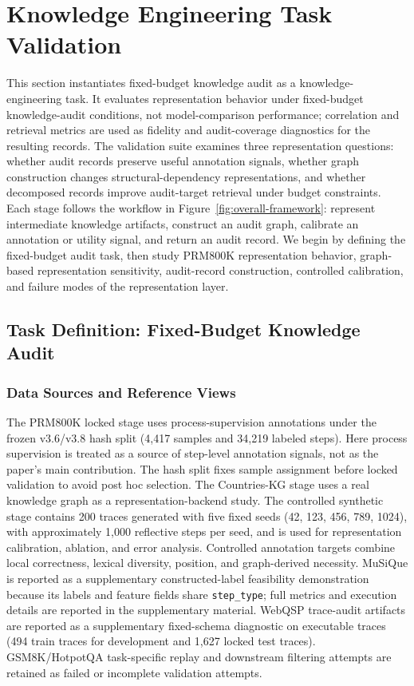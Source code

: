 \documentclass[a4paper,fleqn]{cas-sc}
\begin{document}
\FloatBarrier

\section{Knowledge Engineering Task Validation}
\label{sec:application}
\label{sec:experimental-results}

This section instantiates fixed-budget knowledge audit as a knowledge-engineering task. It evaluates representation behavior under fixed-budget knowledge-audit conditions, not model-comparison performance; correlation and retrieval metrics are used as fidelity and audit-coverage diagnostics for the resulting records. The validation suite examines three representation questions: whether audit records preserve useful annotation signals, whether graph construction changes structural-dependency representations, and whether decomposed records improve audit-target retrieval under budget constraints. Each stage follows the workflow in Figure~\ref{fig:overall-framework}: represent intermediate knowledge artifacts, construct an audit graph, calibrate an annotation or utility signal, and return an audit record. We begin by defining the fixed-budget audit task, then study PRM800K representation behavior, graph-based representation sensitivity, audit-record construction, controlled calibration, and failure modes of the representation layer.

\subsection{Task Definition: Fixed-Budget Knowledge Audit}
\label{sec:application-setup}

\subsubsection{Data Sources and Reference Views}

The PRM800K locked stage uses process-supervision annotations under the frozen v3.6/v3.8 hash split (4,417 samples and 34,219 labeled steps). Here process supervision is treated as a source of step-level annotation signals, not as the paper's main contribution. The hash split fixes sample assignment before locked validation to avoid post hoc selection. The Countries-KG stage uses a real knowledge graph as a representation-backend study. The controlled synthetic stage contains 200 traces generated with five fixed seeds (42, 123, 456, 789, 1024), with approximately 1,000 reflective steps per seed, and is used for representation calibration, ablation, and error analysis. Controlled annotation targets combine local correctness, lexical diversity, position, and graph-derived necessity. MuSiQue is reported as a supplementary constructed-label feasibility demonstration because its labels and feature fields share \texttt{step\_type}; full metrics and execution details are reported in the supplementary material. WebQSP trace-audit artifacts are reported as a supplementary fixed-schema diagnostic on executable traces (494 train traces for development and 1,627 locked test traces). GSM8K/HotpotQA task-specific replay and downstream filtering attempts are retained as failed or incomplete validation attempts.
\end{document}
